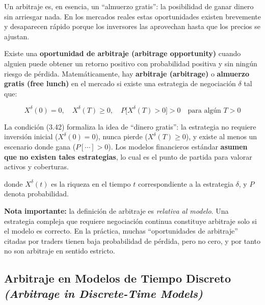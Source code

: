\documentclass[12pt]{article}
\begin{document}
\begin{intuicion}
Un arbitraje es, en esencia, un ``almuerzo gratis'': la posibilidad de ganar dinero sin arriesgar nada. En los mercados reales estas oportunidades existen brevemente y desaparecen r\'apido porque los inversores las aprovechan hasta que los precios se ajustan.
\end{intuicion}

Existe una \textbf{oportunidad de arbitraje (arbitrage opportunity)} cuando alguien puede obtener un retorno positivo con probabilidad positiva y sin ning\'un riesgo de p\'erdida. Matem\'aticamente, hay \textbf{arbitraje (arbitrage)} o \textbf{almuerzo gratis (free lunch)} en el mercado si existe una estrategia de negociaci\'on $\delta$ tal que:

\begin{equation}
  X^\delta(0) = 0, \quad X^\delta(T) \ge 0, \quad P\bigl[X^\delta(T) > 0\bigr] > 0 \quad \text{para alg\'un } T > 0
  \tag{3.42}
\end{equation}

\begin{intuicionmat}
La condici\'on (3.42) formaliza la idea de ``dinero gratis'': la estrategia no requiere inversi\'on inicial ($X^\delta(0) = 0$), nunca pierde ($X^\delta(T) \ge 0$), y existe al menos un escenario donde gana ($P[\cdots]>0$). Los modelos financieros est\'andar \textbf{asumen que no existen tales estrategias}, lo cual es el punto de partida para valorar activos y coberturas.
\end{intuicionmat}

donde $X^\delta(t)$ es la riqueza en el tiempo $t$ correspondiente a la estrategia $\delta$, y $P$ denota probabilidad.

\textbf{Nota importante:} la definici\'on de arbitraje es \textit{relativa al modelo}. Una estrategia compleja que requiere negociaci\'on continua constituye arbitraje solo si el modelo es correcto. En la pr\'actica, muchas ``oportunidades de arbitraje'' citadas por traders tienen baja probabilidad de p\'erdida, pero no cero, y por tanto no son arbitraje en sentido estricto.

\subsection{Arbitraje en Modelos de Tiempo Discreto\\
\textit{(Arbitrage in Discrete-Time Models)}}
\end{document}
